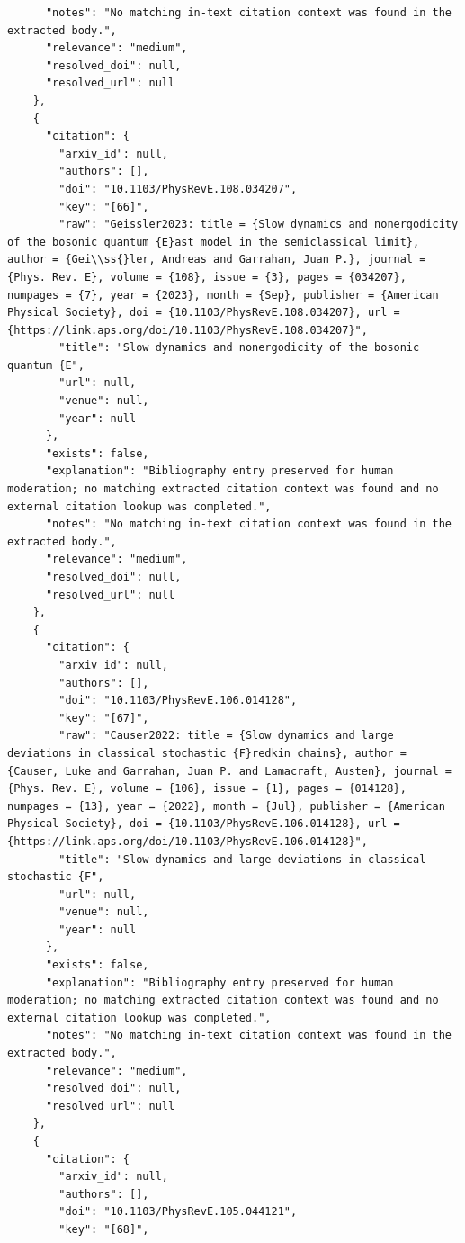 \documentclass[11pt]{article}
\begin{document}
\begin{verbatim}
      "notes": "No matching in-text citation context was found in the extracted body.",
      "relevance": "medium",
      "resolved_doi": null,
      "resolved_url": null
    },
    {
      "citation": {
        "arxiv_id": null,
        "authors": [],
        "doi": "10.1103/PhysRevE.108.034207",
        "key": "[66]",
        "raw": "Geissler2023: title = {Slow dynamics and nonergodicity of the bosonic quantum {E}ast model in the semiclassical limit}, author = {Gei\\ss{}ler, Andreas and Garrahan, Juan P.}, journal = {Phys. Rev. E}, volume = {108}, issue = {3}, pages = {034207}, numpages = {7}, year = {2023}, month = {Sep}, publisher = {American Physical Society}, doi = {10.1103/PhysRevE.108.034207}, url = {https://link.aps.org/doi/10.1103/PhysRevE.108.034207}",
        "title": "Slow dynamics and nonergodicity of the bosonic quantum {E",
        "url": null,
        "venue": null,
        "year": null
      },
      "exists": false,
      "explanation": "Bibliography entry preserved for human moderation; no matching extracted citation context was found and no external citation lookup was completed.",
      "notes": "No matching in-text citation context was found in the extracted body.",
      "relevance": "medium",
      "resolved_doi": null,
      "resolved_url": null
    },
    {
      "citation": {
        "arxiv_id": null,
        "authors": [],
        "doi": "10.1103/PhysRevE.106.014128",
        "key": "[67]",
        "raw": "Causer2022: title = {Slow dynamics and large deviations in classical stochastic {F}redkin chains}, author = {Causer, Luke and Garrahan, Juan P. and Lamacraft, Austen}, journal = {Phys. Rev. E}, volume = {106}, issue = {1}, pages = {014128}, numpages = {13}, year = {2022}, month = {Jul}, publisher = {American Physical Society}, doi = {10.1103/PhysRevE.106.014128}, url = {https://link.aps.org/doi/10.1103/PhysRevE.106.014128}",
        "title": "Slow dynamics and large deviations in classical stochastic {F",
        "url": null,
        "venue": null,
        "year": null
      },
      "exists": false,
      "explanation": "Bibliography entry preserved for human moderation; no matching extracted citation context was found and no external citation lookup was completed.",
      "notes": "No matching in-text citation context was found in the extracted body.",
      "relevance": "medium",
      "resolved_doi": null,
      "resolved_url": null
    },
    {
      "citation": {
        "arxiv_id": null,
        "authors": [],
        "doi": "10.1103/PhysRevE.105.044121",
        "key": "[68]",

\end{verbatim}
\end{document}
